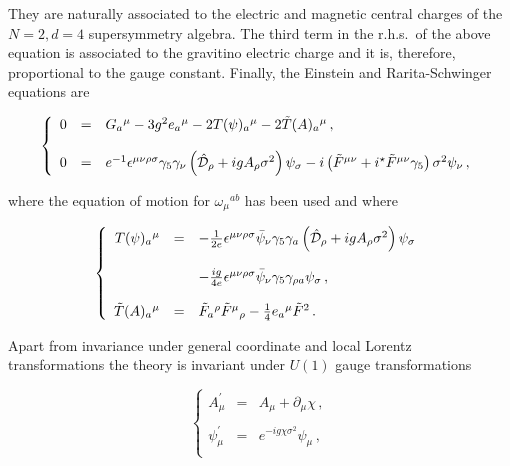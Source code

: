 \documentclass[12pt,a4paper]{article}
\begin{document}
\noindent  They are naturally associated to the electric and 
magnetic central charges of the $N=2,d=4$ supersymmetry algebra.  The
third term in the r.h.s.~of the above equation is associated to the
gravitino electric charge and it is, therefore, proportional to the
gauge constant. Finally, the Einstein and Rarita-Schwinger equations
are

\begin{equation}
\left\{
\begin{array}{rcl}
0 & = & G_{a}{}^{\mu} -3g^{2} e_{a}{}^{\mu} -2T(\psi)_{a}{}^{\mu}
-2\tilde{T}(A)_{a}{}^{\mu}\, ,\\
& & \\
0 & = & e^{-1}\epsilon^{\mu\nu\rho\sigma}
\gamma_{5}\gamma_{\nu}
\left(\hat{\cal D}_{\rho}+ig A_{\rho}\sigma^{2}\right)\psi_{\sigma}
-i\left(\tilde{F}^{\mu\nu} +i{}^{\star}\tilde{F}^{\mu\nu}\gamma_{5}
\right)\sigma^{2}\psi_{\nu}\, ,\\
\end{array}
\right.
\end{equation}

\noindent where the equation of motion for $\omega_{\mu}{}^{ab}$ has
been used and where

\begin{equation}
\label{eq:energymomentumtensors}
\left\{
\begin{array}{rcl}
T(\psi)_{a}{}^{\mu} & = & -\frac{1}{2e}\epsilon^{\mu\nu\rho\sigma}
\bar{\psi}_{\nu}\gamma_{5}\gamma_{a}
\left(\hat{\cal D}_{\rho}+ig A_{\rho}\sigma^{2}\right)\psi_{\sigma}\\
& & \\
& & -\frac{ig}{4e} \epsilon^{\mu\nu\rho\sigma}
\bar{\psi}_{\nu}\gamma_{5}\gamma_{\rho a}\psi_{\sigma}\, ,\\
& & \\
\tilde{T}(A)_{a}{}^{\mu} & = & 
\tilde{F}_{a}{}^{\rho}\tilde{F}^{\mu}{}_{\rho}
-\frac{1}{4}e_{a}{}^{\mu}\tilde{F}^{2}\, .\\
\end{array}
\right.
\end{equation}

Apart from invariance under general coordinate and local Lorentz
transformations the theory is invariant under $U(1)$ gauge
transformations

\begin{equation}
\left\{
\begin{array}{rcl}
A^{\prime}_{\mu} & = & A_{\mu}+\partial_{\mu}\chi\, ,\\
& & \\
\psi_{\mu}^{\prime} & = & e^{-ig\chi\sigma^{2}} \psi_{\mu}\, ,\\
\end{array}
\right.
\end{equation}
\end{document}
